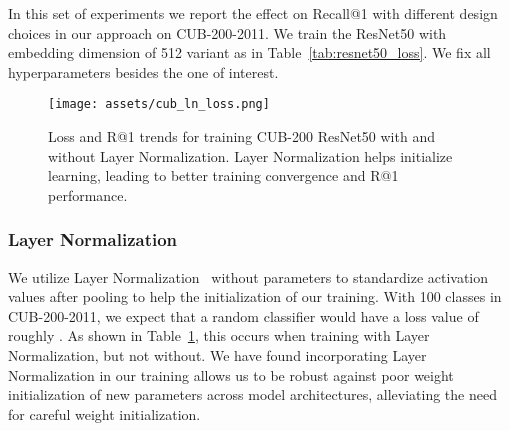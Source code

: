 \documentclass{bmvc2k}
\begin{document}
In this set of experiments we report the effect on Recall@1 with different design choices in our approach on CUB-200-2011. We train the ResNet50 with embedding dimension of 512 variant as in Table~\ref{tab:resnet50_loss}. We fix all hyperparameters besides the one of interest.

\begin{figure}
\centering
  \texttt{[image: assets/cub\_ln\_loss.png]}
   \caption{Loss and R@1 trends for training CUB-200 ResNet50 with and without Layer Normalization. Layer Normalization helps initialize learning, leading to better training convergence and R@1 performance.}
   \label{sec:label_norm_exp}

\end{figure}

\subsubsection{Layer Normalization}
\label{sec:layer_norm_exp}
We utilize Layer Normalization~\cite{layernorm} without parameters to standardize activation values after pooling to help the initialization of our training. With 100 classes in CUB-200-2011, we expect that a random classifier would have a loss value of roughly . As shown in Table~\ref{sec:label_norm_exp}, this occurs when training with Layer Normalization, but not without. We have found incorporating Layer Normalization in our training allows us to be robust against poor weight initialization of new parameters across model architectures, alleviating the need for careful weight initialization.

\begin{table}
\begin{center}
\end{center}
\caption{ResNet50 Recall@1 on CUB-200-2011 dataset across varying samples per class for batch size of 75. (\textbf{S}) Samples per class in batch. (\textbf{C}) Distinct classes in batch. First column shows no class balancing in batch}
\label{tab:class_balance}
\end{table}
\end{document}
